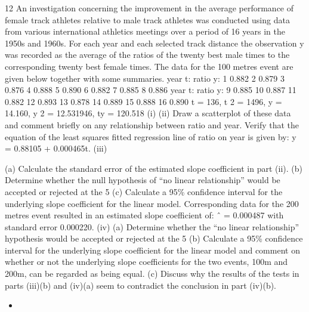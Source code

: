 \documentclass[a4paper,12pt]{article}
\begin{document}
\begin{enumerate}

12
An investigation concerning the improvement in the average performance of female
track athletes relative to male track athletes was conducted using data from various
international athletics meetings over a period of 16 years in the 1950s and 1960s. For
each year and each selected track distance the observation y was recorded as the
average of the ratios of the twenty best male times to the corresponding twenty best
female times.
The data for the 100 metres event are given below together with some summaries.
year t:
ratio y: 1
0.882 2
0.879 3
0.876 4
0.888 5
0.890 6
0.882 7
0.885 8
0.886
year t:
ratio y: 9
0.885 10
0.887 11
0.882 12
0.893 13
0.878 14
0.889 15
0.888 16
0.890
\sigma t = 136, \sigma t 2 = 1496, \sigma y = 14.160, \sigma y 2 = 12.531946, \sigma ty = 120.518
(i)
(ii)
Draw a scatterplot of these data and comment briefly on any relationship
between ratio and year.
Verify that the equation of the least squares fitted regression line of ratio on
year is given by:
y = 0.88105 + 0.000465t.
(iii)


(a) Calculate the standard error of the estimated slope coefficient in part
(ii).
(b) Determine whether the null hypothesis of “no linear relationship”
would be accepted or rejected at the 5%
(c) Calculate a 95\% confidence interval for the underlying slope
coefficient for the linear model.
Corresponding data for the 200 metres event resulted in an estimated slope coefficient
of:
\beta ˆ = 0.000487 with standard error 0.000220.
(iv)
(a) Determine whether the “no linear relationship” hypothesis would be
accepted or rejected at the 5%
(b) Calculate a 95\% confidence interval for the underlying slope
coefficient for the linear model and comment on whether or not the
underlying slope coefficients for the two events, 100m and 200m, can
be regarded as being equal.
(c) Discuss why the results of the tests in parts (iii)(b) and (iv)(a) seem to
contradict the conclusion in part (iv)(b).

\newpage




\begin{itemize}
\item 


\end{itemize}
\end{enumerate}
\end{document}
